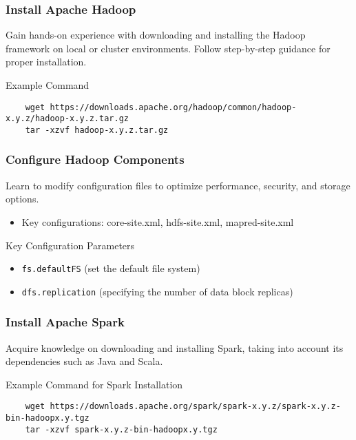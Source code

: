 \documentclass{beamer}
\begin{document}
\begin{frame}[fragile]
    \frametitle{Install Apache Hadoop}
    Gain hands-on experience with downloading and installing the Hadoop framework on local or cluster environments. Follow step-by-step guidance for proper installation.
    
    \begin{block}{Example Command}
    \begin{lstlisting}
    wget https://downloads.apache.org/hadoop/common/hadoop-x.y.z/hadoop-x.y.z.tar.gz
    tar -xzvf hadoop-x.y.z.tar.gz
    \end{lstlisting}
    \end{block}
\end{frame}

\begin{frame}[fragile]
    \frametitle{Configure Hadoop Components}
    Learn to modify configuration files to optimize performance, security, and storage options.

    \begin{itemize}
        \item Key configurations: core-site.xml, hdfs-site.xml, mapred-site.xml
    \end{itemize}
    
    \begin{block}{Key Configuration Parameters}
        \begin{itemize}
            \item \texttt{fs.defaultFS} (set the default file system)
            \item \texttt{dfs.replication} (specifying the number of data block replicas)
        \end{itemize}
    \end{block}
\end{frame}

\begin{frame}[fragile]
    \frametitle{Install Apache Spark}
    Acquire knowledge on downloading and installing Spark, taking into account its dependencies such as Java and Scala. 

    \begin{block}{Example Command for Spark Installation}
    \begin{lstlisting}
    wget https://downloads.apache.org/spark/spark-x.y.z/spark-x.y.z-bin-hadoopx.y.tgz
    tar -xzvf spark-x.y.z-bin-hadoopx.y.tgz
    \end{lstlisting}
    \end{block}
\end{frame}
\end{document}
